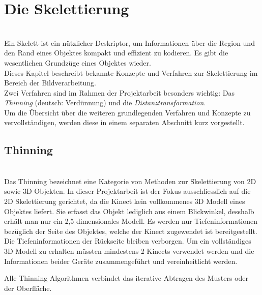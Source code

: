 \chapter{Die Skelettierung}
\\
Ein Skelett ist ein nützlicher Deskriptor, um Informationen über die Region und den Rand eines Objektes kompakt und effizient
zu kodieren. Es gibt die wesentlichen Grundzüge eines Objektes wieder.\\
Dieses Kapitel beschreibt bekannte Konzepte und Verfahren zur Skelettierung im Bereich der Bildverarbeitung.\\
Zwei Verfahren sind im Rahmen der Projektarbeit besonders wichtig: Das \emph{Thinning} (deutsch: Verdünnung) und die \emph{Distanztransformation}. \\
Um die Übersicht über die weiteren grundlegenden Verfahren und Konzepte zu vervollständigen, werden diese in einem separaten 
Abschnitt kurz vorgestellt.
\section{Thinning}
\\
Das Thinning bezeichnet eine Kategorie von Methoden zur Skelettierung von 2D sowie 3D Objekten. In dieser Projektarbeit ist der Fokus ausschliesslich auf die 2D Skelettierung gerichtet, da die Kinect kein vollkommenes 3D Modell eines Objektes liefert. Sie erfasst das Objekt lediglich aus einem Blickwinkel, desshalb erhält man nur ein 2,5 dimensionales Modell. Es werden nur Tiefeninformationen bezüglich der Seite des Objektes, welche der Kinect zugewendet ist bereitgestellt. Die  Tiefeninformationen der Rückseite bleiben verborgen. Um ein vollständiges 3D Modell zu erhalten müssten mindestens 2 Kinects verwendet werden und die Informationen beider Geräte zusammengeführt und vereinheitlicht werden. 

Alle Thinning Algorithmen verbindet das iterative Abtragen des Musters oder der Oberfläche.

